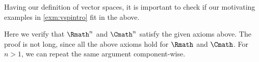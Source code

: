 Having our definition of vector spaces,
it is important to check if
our motivating examples in \cref{exm:vspintro} fit in the above.

\begin{example}
    \label{exm:vsintroverif}
    Here we verify that
    \(\Rmath^n\) and \(\Cmath^n\) satisfy the given axioms above.
    The proof is not long,
    since all the above axioms hold for \(\Rmath\) and \(\Cmath\).
    For \(n>1\), we can repeat the same argument component-wise.
\end{example}